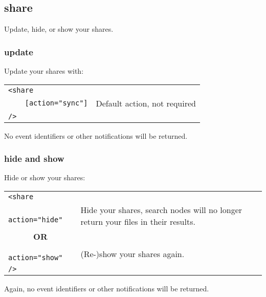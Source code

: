 \documentclass[10pt]{article}
\begin{document}
\subsection{share}
Update, hide, or show your shares.

\subsubsection{update}
Update your shares with:

\begin{tabular}{p{3.9cm}p{7.2cm}}
\verb|<share|   & \\
\verb|    [action="sync"]|    & Default action, not required \\
\verb|/>|       &
\end{tabular}

No event identifiers or other notifications will be returned.

\subsubsection{hide and show}
Hide or show your shares:

\begin{tabular}{p{3.9cm}p{7.2cm}}
\verb|<share|   & \\
\verb|    action="hide"|    & Hide your shares, search nodes will no longer return your files in their results. \\
\verb|      |\textbf{OR}    & \\
\verb|    action="show"|    & (Re-)show your shares again. \\
\verb|/>|       &
\end{tabular}

Again, no event identifiers or other notifications will be returned.
  
\end{document}
